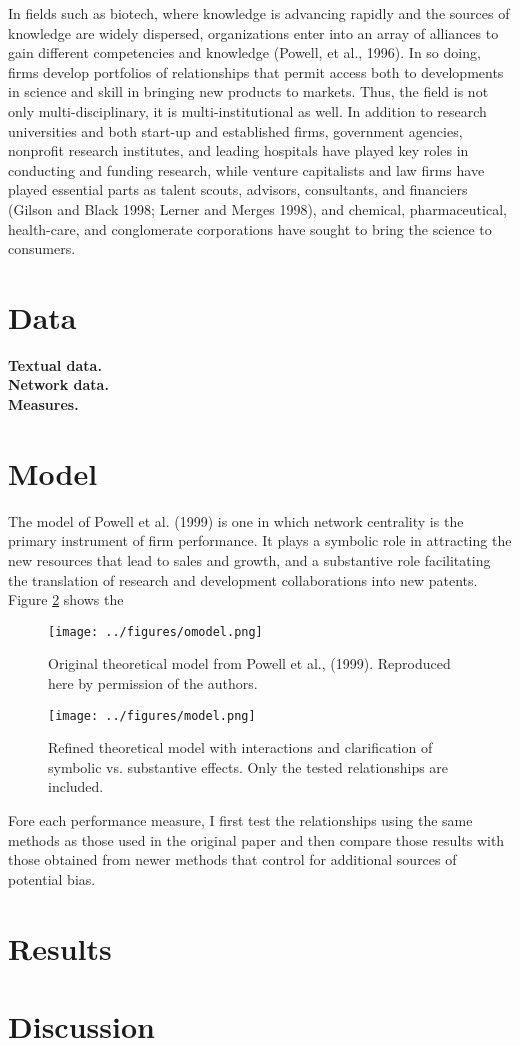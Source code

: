 In fields such as biotech, where knowledge is advancing rapidly and the sources of knowledge are widely dispersed, organizations enter into an array of alliances to gain different competencies and knowledge (Powell, et al., 1996). In so doing, firms develop portfolios of relationships that permit access both to developments in science and skill in bringing new products to markets. Thus, the field is not only multi-disciplinary, it is multi-institutional as well. In addition to research universities and both start-up and established firms, government agencies, nonprofit research institutes, and leading hospitals have played key roles in conducting and funding research, while venture capitalists and law firms have played essential parts as talent scouts, advisors, consultants, and financiers (Gilson and Black 1998; Lerner and Merges 1998), and chemical, pharmaceutical, health-care, and conglomerate corporations have sought to bring the science to consumers.  

\section{Data}

\textbf{Textual data.}\\
\textbf{Network data.}\\
\textbf{Measures.}\\
\section{Model}
The model of Powell et al. (1999) is one in which network centrality is the primary instrument of firm performance. It plays a symbolic role in attracting the new resources that lead to sales and growth, and a substantive role facilitating the translation of research and development collaborations into new patents. Figure \ref{model} shows the 

\begin{figure}
\begin{center}
\texttt{[image: ../figures/omodel.png]}
\caption[Powell et al., (1999) Model]{Original theoretical model from Powell et al., (1999). Reproduced here by permission of the authors.\label{model}}
\end{center}
\end{figure}


\begin{figure}
\begin{center}
\texttt{[image: ../figures/model.png]}
\caption[Refined Theoretical Model]{Refined theoretical model with interactions and clarification of symbolic vs. substantive effects. Only the tested relationships are included.\label{model}}
\end{center}
\end{figure}

Fore each performance measure, I first test the relationships using the same methods as those used in the original paper and then compare those results with those obtained from newer methods that control for additional sources of potential bias.

\section{Results}
\section{Discussion}